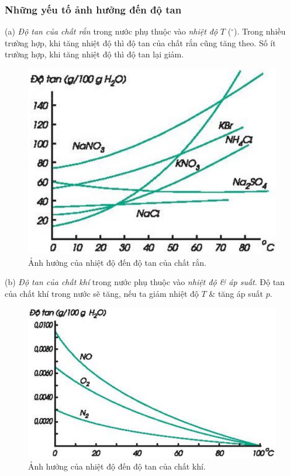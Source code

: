 \documentclass{article}
\begin{document}
\subsubsection{Những yếu tố ảnh hưởng đến độ tan}
(a) \textit{Độ tan của chất rắn} trong nước phụ thuộc vào \textit{nhiệt độ} $T$ (${}^\circ$). Trong nhiều trường hợp, khi tăng nhiệt độ thì độ tan của chất rắn cũng tăng theo. Số ít trường hợp, khi tăng nhiệt độ thì độ tan lại giảm.
\begin{figure}[H]
	\centering
	\includegraphics[scale=0.3]{nhiet_do_do_tan_chat_ran}
	\caption{Ảnh hưởng của nhiệt độ đến độ tan của chất rắn.}
\end{figure}
\noindent(b) \textit{Độ tan của chất khí} trong nước phụ thuộc vào \textit{nhiệt độ \& áp suất}. Độ tan của chất khí trong nước sẽ tăng, nếu ta giảm nhiệt độ $T$ \& tăng áp suất $p$.
\begin{figure}[H]
	\centering
	\includegraphics[scale=0.3]{nhiet_do_do_tan_chat_khi}
	\caption{Ảnh hưởng của nhiệt độ đến độ tan của chất khí.}
\end{figure}
\end{document}
